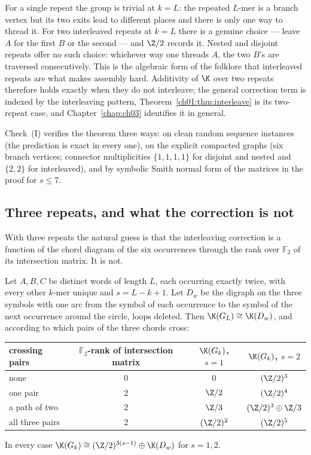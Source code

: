 \begin{remark}[Reading]\label{ch01:rem:reading}
For a single repeat the group is trivial at $k=L$: the repeated $L$-mer is a branch vertex
but its two exits lead to different places and there is only one way to thread it. For
two interleaved repeats at $k=L$ there is a genuine choice --- leave $A$ for the first $B$
or the second --- and $\Z/2$ records it. Nested and disjoint repeats offer no such
choice: whichever way one threads $A$, the two $B$'s are traversed consecutively. This is
the algebraic form of the folklore that interleaved repeats are what makes assembly hard.
Additivity of $\K$ over two repeats therefore holds exactly when they do not interleave;
the general correction term is indexed by the interleaving pattern,
Theorem~\ref{ch01:thm:interleave} is its two-repeat case, and Chapter~\ref{chap:ch03} identifies it in
general.
\end{remark}

Check~(I) verifies the theorem three ways: on clean random sequence instances (the
prediction is exact in every one), on the explicit compacted graphs (six branch vertices;
connector multiplicities $\{1,1,1,1\}$ for disjoint and nested and $\{2,2\}$ for
interleaved), and by symbolic Smith normal form of the matrices in the proof for
$s\le7$.

\subsection*{Three repeats, and what the correction is not}

With three repeats the natural guess is that the
interleaving correction is a function of the chord diagram of the six occurrences through
the rank over $\mathbb F_2$ of its intersection matrix. It is not.

\begin{proposition}\label{ch01:prop:three}
Let $A,B,C$ be distinct words of length $L$, each occurring exactly twice, with every other
$k$-mer unique and $s=L-k+1$. Let $D_w$ be the digraph on the three symbols with one arc
from the symbol of each occurrence to the symbol of the next occurrence around the circle,
loops deleted. Then $\K(G_L)\cong\K(D_w)$, and according to which pairs of the three chords
cross:
\begin{center}\small
\begin{tabular}{lccc}
\toprule
crossing pairs & $\mathbb F_2$-rank of intersection matrix & $\K(G_k)$, $s=1$ & $\K(G_k)$, $s=2$\\
\midrule
none            & $0$ & $0$            & $(\Z/2)^{3}$\\
one pair        & $2$ & $\Z/2$         & $(\Z/2)^{4}$\\
a path of two   & $2$ & $\Z/3$         & $(\Z/2)^{3}\oplus\Z/3$\\
all three pairs & $2$ & $(\Z/2)^{2}$   & $(\Z/2)^{5}$\\
\bottomrule
\end{tabular}
\end{center}
In every case $\K(G_k)\cong(\Z/2)^{3(s-1)}\oplus\K(D_w)$ for $s=1,2$.
\end{proposition}

